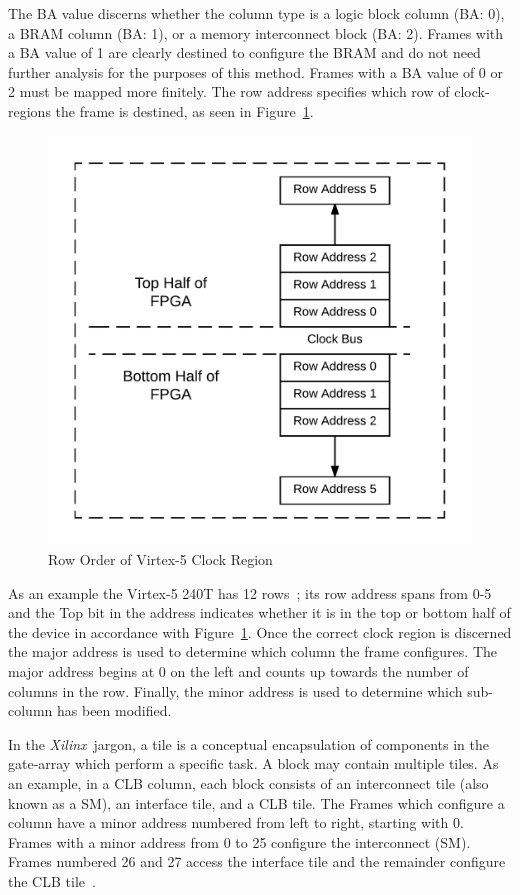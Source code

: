 \documentclass[conference]{IEEEtran}
\newcommand{\Xilinx}{\textit{\gls{Xilinx}}~}
\begin{document}
The \acrfull{BA} value discerns whether the column type is a logic block column (BA: 0), a \acrfull{BRAM} column (BA: 1), or a memory interconnect block (BA: 2).
Frames with a \acrshort{BA} value of 1 are clearly destined to configure the \acrshort{BRAM} and do not need further analysis for the purposes of this method.
Frames with a \acrshort{BA} value of 0 or 2 must be mapped more finitely.
The row address specifies which row of clock-regions the frame is destined, as seen in Figure~\ref{fig:RowOrder}.
\begin{figure}[h]
	\centering
	\includegraphics[width=.85\linewidth]{../Thesis/Figures/RowOrder}
	\caption[Row Order of Virtex-5 Clock Region]{Row Order of Virtex-5 Clock Region}
	\label{fig:RowOrder}
\end{figure}
As an example the Virtex-5 240T has 12 rows~\cite{virtex5ConfigGuide}; its row address spans from 0-5 and the Top bit in the address indicates whether it is in the top or bottom half of the device in accordance with Figure~\ref{fig:RowOrder}.
Once the correct clock region is discerned the major address is used to determine which column the frame configures.
The major address begins at 0 on the left and counts up towards the number of columns in the row.
Finally, the minor address is used to determine which sub-column has been modified.

In the \Xilinx jargon, a tile is a conceptual encapsulation of components in the gate-array which perform a specific task.
A block may contain multiple tiles.
As an example, in a \acrfull{CLB} column, each block consists of an interconnect tile (also known as a \acrfull{SM}), an interface tile, and a \acrshort{CLB} tile.
The Frames which configure a column have a minor address numbered from left to right, starting with 0. 
Frames with a minor address from 0 to 25 configure the interconnect (\acrshort{SM}).
Frames numbered 26 and 27 access the interface tile and the remainder configure the \acrshort{CLB} tile~\cite{virtex5ConfigGuide}.
\end{document}
